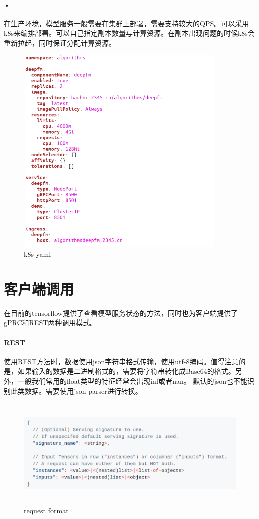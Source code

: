 \documentclass[12pt,a4paper,oneside]{article}
\begin{document}
\begin{CJK*}{UTF8}{gbsn}
\paragraph{•} 在生产环境，模型服务一般需要在集群上部署，需要支持较大的QPS。可以采用k8s来编排部署。可以自己指定副本数量与计算资源。在副本出现问题的时候k8s会重新拉起，同时保证分配计算资源。
\begin{figure}[H]
\centering
\includegraphics[width=4in,height=4in]{k8s}
\caption{k8s yaml}
\end{figure}

\section{客户端调用}
在目前的tensorflow提供了查看模型服务状态的方法，同时也为客户端提供了gPRC和REST两种调用模式。

\paragraph{REST}
使用REST方法时，数据使用json字符串格式传输，使用utf-8编码。值得注意的是，如果输入的数据是二进制格式的，需要将字符串转化成Base64的格式。另外，一般我们常用的float类型的特征经常会出现inf或者nan。 默认的json也不能识别此类数据。需要使用json parser进行转换。


\begin{figure}[H]
\centering
\includegraphics[width=6in,height=2.1in]{requestformat}
\caption{request format}
\end{figure} 


\end{CJK*}
\end{document}
